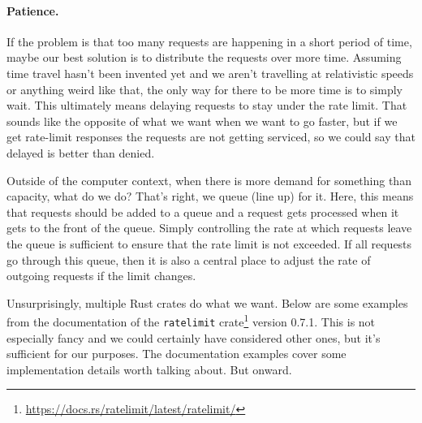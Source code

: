 \paragraph{Patience.}
If the problem is that too many requests are happening in a short period of time, maybe our best solution is to distribute the requests over more time. Assuming time travel hasn't been invented yet and we aren't travelling at relativistic speeds or anything weird like that, the only way for there to be more time is to simply wait. This ultimately means delaying requests to stay under the rate limit. That sounds like the opposite of what we want when we want to go faster, but if we get rate-limit responses the requests are not getting serviced, so we could say that delayed is better than denied.

Outside of the computer context, when there is more demand for something than capacity, what do we do? That's right, we queue (line up) for it. Here, this means that requests should be added to a queue and a request gets processed when it gets to the front of the queue. Simply controlling the rate at which requests leave the queue is sufficient to ensure that the rate limit is not exceeded. If all requests go through this queue, then it is also a central place to adjust the rate of outgoing requests if the limit changes. 

Unsurprisingly, multiple Rust crates do what we want. Below are some examples from the documentation of the \texttt{ratelimit} crate\footnote{\url{https://docs.rs/ratelimit/latest/ratelimit/}} version 0.7.1. This is not especially fancy and we could certainly have considered other ones, but it's sufficient for our purposes. The documentation examples cover some implementation details worth talking about. But onward.

